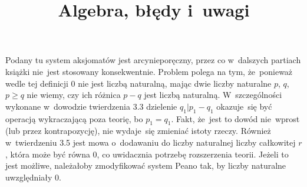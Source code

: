 \documentclass[a4paper,11pt]{article}
\title{Algebra, błędy i~uwagi}
\begin{document}



\maketitle  %









\start {} Podany tu system aksjomatów jest arcynieporęczny,
przez co w~dalszych partiach książki nie~jest stosowany konsekwentnie.
Problem polega na tym, że~ponieważ wedle tej definicji 0 nie jest
liczbą naturalną, mając dwie liczby naturalne $p$, $q$, $p \geq q$ nie
wiemy, czy ich różnica $p - q$ jest liczbą naturalną. W~szczególności
wykonane w~dowodzie twierdzenia 3.3 dzielenie
$q_{ 1 } | p_{ 1 } - q_{ 1 }$ okazuje~się być operacją wykraczającą
poza teorię, bo $p_{ 1 } = q_{ 1 }$. Fakt, że~jest to dowód nie~wprost
(lub przez kontrapozycję), nie wydaje~się zmieniać istoty rzeczy.
Również w~twierdzeniu 3.5 jest mowa o~dodawaniu do liczby naturalnej
liczby całkowitej $r$, która może być równa 0, co uwidacznia potrzebę
rozszerzenia teorii. Jeżeli to jest możliwe, należałoby zmodyfikować
system Peano tak, by liczby naturalne uwzględniały 0.
\end{document}

